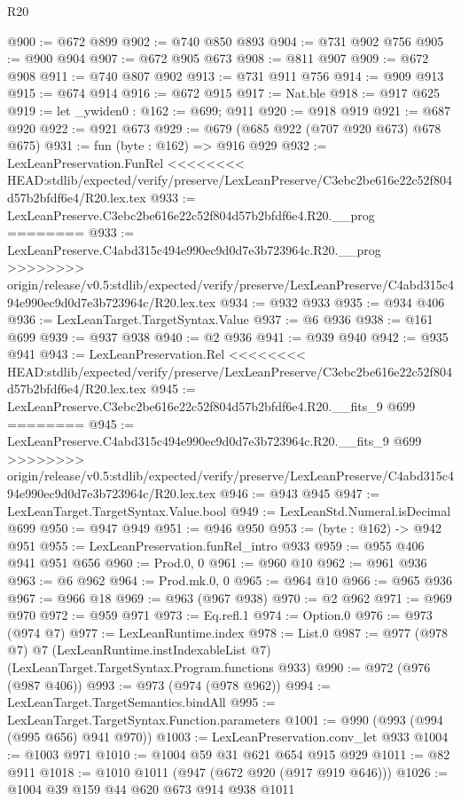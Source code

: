 \begin{lexlean}{R20}
\begin{coremodule}
{{{{{{{{{{{{{{{{{{{@900 := @672 @899
@902 := @740 @850 @893
@904 := @731 @902 @756
@905 := @900 @904
@907 := @672 @905 @673
@908 := @811 @907
@909 := @672 @908
@911 := @740 @807 @902
@913 := @731 @911 @756
@914 := @909 @913
@915 := @674 @914
@916 := @672 @915
@917 := Nat.ble
@918 := @917 @625
@919 := let _ywiden0 : @162 := @699; @911
@920 := @918 @919
@921 := @687 @920
@922 := @921 @673
@929 := @679 (@685 @922 (@707 @920 @673) @678 @675)
@931 := fun (byte : @162) => @916 @929
@932 := LexLeanPreservation.FunRel
<<<<<<<< HEAD:stdlib/expected/verify/preserve/LexLeanPreserve/C3ebc2be616e22c52f804d57b2bfdf6e4/R20.lex.tex
@933 := LexLeanPreserve.C3ebc2be616e22c52f804d57b2bfdf6e4.R20.__prog
========
@933 := LexLeanPreserve.C4abd315c494e990ec9d0d7e3b723964c.R20.__prog
>>>>>>>> origin/release/v0.5:stdlib/expected/verify/preserve/LexLeanPreserve/C4abd315c494e990ec9d0d7e3b723964c/R20.lex.tex
@934 := @932 @933
@935 := @934 @406
@936 := LexLeanTarget.TargetSyntax.Value
@937 := @6 @936
@938 := @161 @699
@939 := @937 @938
@940 := @2 @936
@941 := @939 @940
@942 := @935 @941
@943 := LexLeanPreservation.Rel
<<<<<<<< HEAD:stdlib/expected/verify/preserve/LexLeanPreserve/C3ebc2be616e22c52f804d57b2bfdf6e4/R20.lex.tex
@945 := LexLeanPreserve.C3ebc2be616e22c52f804d57b2bfdf6e4.R20.__fits_9 @699
========
@945 := LexLeanPreserve.C4abd315c494e990ec9d0d7e3b723964c.R20.__fits_9 @699
>>>>>>>> origin/release/v0.5:stdlib/expected/verify/preserve/LexLeanPreserve/C4abd315c494e990ec9d0d7e3b723964c/R20.lex.tex
@946 := @943 @945
@947 := LexLeanTarget.TargetSyntax.Value.bool
@949 := LexLeanStd.Numeral.isDecimal @699
@950 := @947 @949
@951 := @946 @950
@953 := (byte : @162) -> @942 @951
@955 := LexLeanPreservation.funRel_intro @933
@959 := @955 @406 @941 @951 @656
@960 := Prod.{0, 0}
@961 := @960 @10
@962 := @961 @936
@963 := @6 @962
@964 := Prod.mk.{0, 0}
@965 := @964 @10
@966 := @965 @936
@967 := @966 @18
@969 := @963 (@967 @938)
@970 := @2 @962
@971 := @969 @970
@972 := @959 @971
@973 := Eq.refl.{1}
@974 := Option.{0}
@976 := @973 (@974 @7)
@977 := LexLeanRuntime.index
@978 := List.{0}
@987 := @977
    (@978 @7)
    @7
    (LexLeanRuntime.instIndexableList @7)
    (LexLeanTarget.TargetSyntax.Program.functions @933)
@990 := @972 (@976 (@987 @406))
@993 := @973 (@974 (@978 @962))
@994 := LexLeanTarget.TargetSemantics.bindAll
@995 := LexLeanTarget.TargetSyntax.Function.parameters
@1001 := @990 (@993 (@994 (@995 @656) @941 @970))
@1003 := LexLeanPreservation.conv_let @933
@1004 := @1003 @971
@1010 := @1004 @59 @31 @621 @654 @915 @929
@1011 := @82 @911
@1018 := @1010 @1011 (@947 (@672 @920 (@917 @919 @646)))
@1026 := @1004 @39 @159 @44 @620 @673 @914 @938 @1011
}}}}}}}}}}}}}}}}}}}
\end{coremodule}
\end{lexlean}
